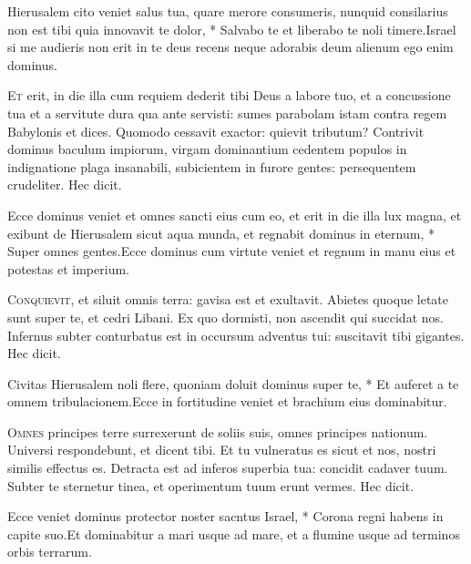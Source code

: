 \begin{multicols*}{2}
\begin{responsory}
{Hierusalem cito veniet salus tua, quare merore consumeris, nunquid consilarius non est tibi quia innovavit te dolor, * Salvabo te et liberabo te noli timere.}{Israel si me audieris non erit in te deus recens neque adorabis deum alienum ego enim dominus.}
\end{responsory}
\lettrine[lines=2]{\zallmancaps \color{Blue} E}{t} erit, in die illa cum requiem dederit tibi Deus a labore tuo, et a concussione tua et a servitute dura qua ante servisti: sumes parabolam istam contra regem Babylonis et dices. Quomodo cessavit exactor: quievit tributum? Contrivit dominus baculum impiorum, virgam dominantium cedentem populos in indignatione plaga insanabili, subicientem in furore gentes: persequentem crudeliter. Hec dicit.
\begin{responsory}
{Ecce dominus veniet et omnes sancti eius cum eo, et erit in die illa lux magna, et exibunt de Hierusalem sicut aqua munda, et regnabit dominus in eternum, * Super omnes gentes.}{Ecce dominus cum virtute veniet et regnum in manu eius et potestas et imperium.}
\end{responsory}
\lettrine[lines=2]{\zallmancaps \color{Red} C}{onquievit}, et siluit omnis terra: gavisa est et exultavit. Abietes quoque letate sunt super te, et cedri Libani. Ex quo dormisti, non ascendit qui succidat nos. Infernus subter conturbatus est in occursum adventus tui: suscitavit tibi gigantes. Hec dicit.
\begin{responsory-doxology}
{Civitas Hierusalem noli flere, quoniam doluit dominus super te, * Et auferet a te omnem tribulacionem.}{Ecce in fortitudine veniet et brachium eius dominabitur.}
\end{responsory-doxology}
\lettrine[lines=2]{\zallmancaps \color{Blue} O}{mnes} principes terre surrexerunt de soliis suis, omnes principes nationum. Universi respondebunt, et dicent tibi. Et tu vulneratus es sicut et nos, nostri similis effectus es. Detracta est ad inferos superbia tua: concidit cadaver tuum. Subter te sternetur tinea, et operimentum tuum erunt vermes. Hec dicit.
\begin{responsory}
{Ecce veniet dominus protector noster sacntus Israel, * Corona regni habens in capite suo.}{Et dominabitur a mari usque ad mare, et a flumine usque ad terminos orbis terrarum.}

\end{responsory}
\end{multicols*}
